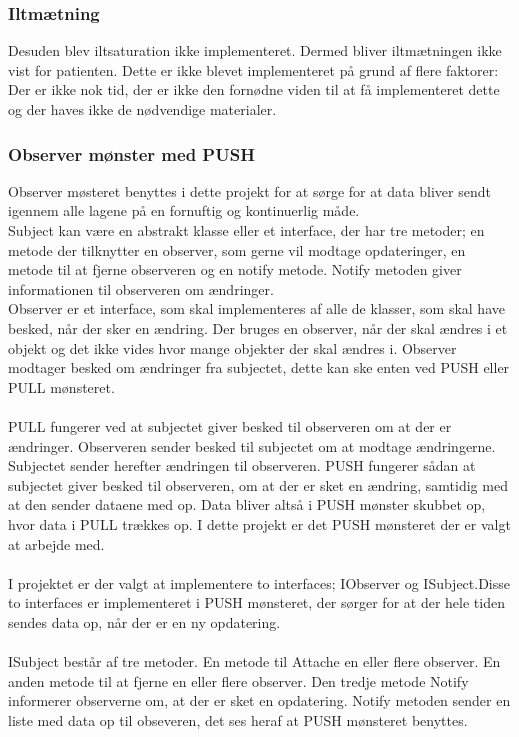 \subsubsection{Iltmætning}
Desuden blev iltsaturation ikke implementeret. Dermed bliver iltmætningen ikke vist for patienten. Dette er ikke blevet implementeret på grund af flere faktorer: Der er ikke nok tid, der er ikke den fornødne viden til at få implementeret dette og der haves ikke de nødvendige materialer.
\subsubsection{Observer mønster med PUSH}
Observer møsteret benyttes i dette projekt for at sørge for at data bliver sendt igennem alle lagene på en fornuftig og kontinuerlig måde.\\
Subject kan være en abstrakt klasse eller et interface, der har tre metoder; en metode der tilknytter en observer, som gerne vil modtage opdateringer, en metode til at fjerne observeren og en notify metode. Notify metoden giver informationen til observeren om ændringer.\\
Observer er et interface, som skal implementeres af alle de klasser, som skal have besked, når der sker en ændring. Der bruges en observer, når der skal ændres i et objekt og det ikke vides hvor mange objekter der skal ændres i. Observer modtager besked om ændringer fra subjectet, dette kan ske enten ved PUSH eller PULL mønsteret. \\\\
PULL fungerer ved at subjectet giver besked til observeren om at der er ændringer. Observeren sender besked til subjectet om at modtage ændringerne. Subjectet sender herefter ændringen til observeren.
PUSH fungerer sådan at subjectet giver besked til observeren, om at der er sket en ændring, samtidig med at den sender dataene med op. Data bliver altså i PUSH mønster skubbet op, hvor data i PULL trækkes op. I dette projekt er det PUSH mønsteret der er valgt at arbejde med.\\ 
\\
I projektet er der valgt at implementere to interfaces; IObserver og ISubject.Disse to interfaces er implementeret i PUSH mønsteret, der sørger for at der hele tiden sendes data op, når der er en ny opdatering. \\
\\
ISubject består af tre metoder. En metode til Attache en eller flere observer. En anden metode til at fjerne en eller flere observer. Den tredje metode Notify informerer observerne om, at der er sket en opdatering. Notify metoden sender en liste med data op til obseveren, det ses heraf at PUSH mønsteret benyttes.\\
